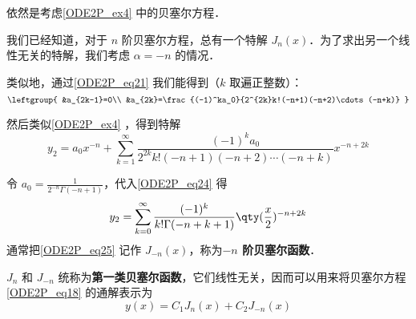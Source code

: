 \begin{example}{}\label{ODE2P_ex5}
依然是考虑\autoref{ODE2P_ex4} 中的贝塞尔方程．

我们已经知道，对于 $n$ 阶贝塞尔方程，总有一个特解 $J_n(x)$．为了求出另一个线性无关的特解，我们考虑 $\alpha=-n$ 的情况．

类似地，通过\autoref{ODE2P_eq21} 我们能得到（$k$ 取遍正整数）：
\begin{equation}
\leftgroup{
    &a_{2k-1}=0\\
    &a_{2k}=\frac{(-1)^ka_0}{2^{2k}k!(-n+1)(-n+2)\cdots(-n+k)}
}
\end{equation}

然后类似\autoref{ODE2P_ex4} ，得到特解
\begin{equation}\label{ODE2P_eq24}
y_2=a_0x^{-n}+\sum\limits^\infty_{k=1}\frac{(-1)^ka_0}{2^{2k}k!(-n+1)(-n+2)\cdots(-n+k)}x^{-n+2k}
\end{equation}

令 $a_0=\frac{1}{2^{-n}\Gamma(-n+1)}$，代入\autoref{ODE2P_eq24} 得
\begin{equation}\label{ODE2P_eq25}
y_2=\sum\limits^\infty_{k=0}\frac{(-1)^k}{k!\Gamma(-n+k+1)}\qty(\frac{x}{2})^{-n+2k}
\end{equation}
通常把\autoref{ODE2P_eq25} 记作 $J_{-n}(x)$，称为\textbf{$-n$ 阶贝塞尔函数}．



\end{example}

$J_n$ 和 $J_{-n}$ 统称为\textbf{第一类贝塞尔函数}，它们线性无关，因而可以用来将贝塞尔方程\autoref{ODE2P_eq18} 的通解表示为
\begin{equation}
y(x)=C_1J_n(x)+C_2J_{-n}(x)
\end{equation}


















